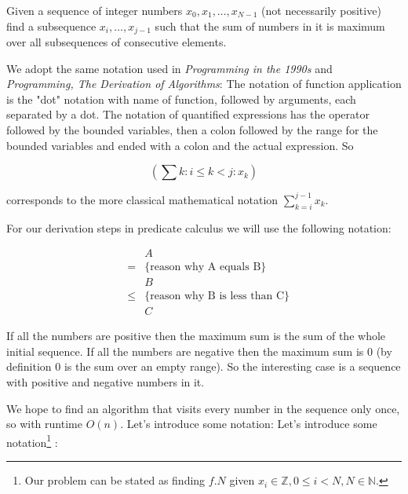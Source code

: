 \vspace{10 mm}
\begin{problem}
Given a sequence  of integer numbers $x_0, x_1, \dots, x_{N-1}$ (not necessarily positive) find a subsequence $x_i,\dots,x_{j - 1}$ such that the sum of numbers in it is maximum over all subsequences of consecutive elements.
\end{problem}

We adopt the same notation used in \textit{Programming in the 1990s} \cite{Cohen90} and \textit{Programming, The Derivation of Algorithms}\cite{Kaldewaij90}: The notation of function application is the "dot" notation with name of function, followed by arguments, each separated by a dot. The notation of quantified expressions has the operator followed by the bounded variables, then a colon followed by the range for the bounded variables and ended with a colon and the actual expression. So

\begin{equation*}	 
	(\sum k : i \leq k < j : x_k)
\end{equation*}

\noindent corresponds to the more classical mathematical notation $\sum_{k = i}^{ j - 1}x_k$. 

\noindent For our derivation steps in predicate calculus we will use the following notation:

\begin{equation*}
\begin{array}{lcl}
		&&A \\
	      &=& \{  \mbox{reason why A equals B} \} \\      
                  &&B \\
                &\leq& \{ \mbox{reason why B is less than C} \} \\
                  && C  
   \end{array}
\end{equation*}

If all the numbers are positive then the maximum sum is the sum of the whole initial sequence. If all the numbers are negative then the maximum sum is 0 (by definition 0 is the sum over an empty range). So the interesting case is a sequence with positive and negative numbers in it.

We hope to find an algorithm that visits every number in the sequence only once, so with runtime $O(n)$. Let's introduce some notation:
Let's introduce some notation\footnote{Our problem can be stated as finding $f.N$ given $x_i \in \mathbb{Z}, 0 \leq i < N, N \in \mathbb{N}$.}
:

